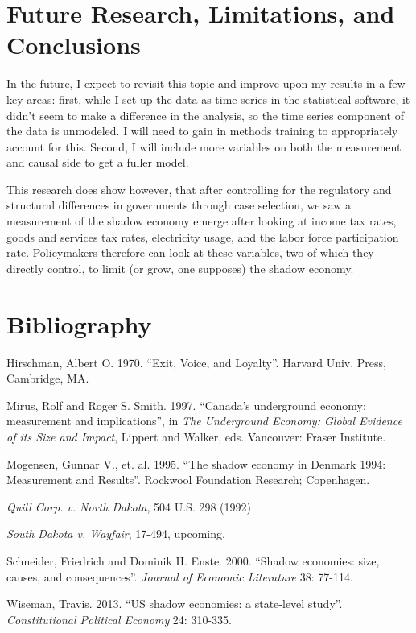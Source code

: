 \documentclass[12pt]{report}
\begin{document}
\section*{Future Research, Limitations, and Conclusions}

In the future, I expect to revisit this topic and improve upon my results in a few key areas: first, while I set up the data as time series in the statistical software, it didn't seem to make a difference in the analysis, so the time series component of the data is unmodeled. I will need to gain in methods training to appropriately account for this. Second, I will include more variables on both the measurement and causal side to get a fuller model.

This research does show however, that after controlling for the regulatory and structural differences in governments through case selection, we saw a measurement of the shadow economy emerge after looking at income tax rates, goods and services tax rates, electricity usage, and the labor force participation rate. Policymakers therefore can look at these variables, two of which they directly control, to limit (or grow, one supposes) the shadow economy.

\section*{Bibliography}

Hirschman, Albert O. 1970. ``Exit, Voice, and Loyalty''. Harvard Univ. Press, Cambridge, MA.

Mirus, Rolf and Roger S. Smith. 1997. ``Canada's underground economy: measurement and implications'', in \textit{The Underground Economy: Global Evidence of its Size and Impact}, Lippert and Walker, eds. Vancouver: Fraser Institute.

Mogensen, Gunnar V., et. al. 1995. ``The shadow economy in Denmark 1994: Measurement and Results''. Rockwool Foundation Research; Copenhagen.

\textit{Quill Corp. v. North Dakota}, 504 U.S. 298 (1992)

\textit{South Dakota v. Wayfair}, 17-494, upcoming.

Schneider, Friedrich and Dominik H. Enste. 2000. ``Shadow economies: size, causes, and consequences''. \textit{Journal of Economic Literature} 38: 77-114.

Wiseman, Travis. 2013. ``US shadow economies: a state-level study''. \textit{Constitutional Political Economy} 24: 310-335.
\end{document}
